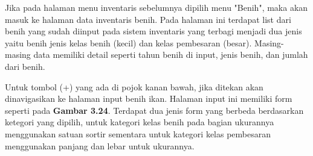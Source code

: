 \begin{enumerate}
\begin{enumerate}
		Jika pada halaman menu inventaris sebelumnya dipilih menu "Benih", maka akan masuk ke halaman data inventaris benih. Pada halaman ini terdapat list dari benih yang sudah diinput pada sistem inventaris yang terbagi menjadi dua jenis yaitu benih jenis kelas benih (kecil) dan kelas pembesaran (besar). Masing-masing data memiliki detail seperti tahun benih di input, jenis benih, dan jumlah dari benih.

		Untuk tombol (+) yang ada di pojok kanan bawah, jika ditekan akan dinavigasikan ke halaman input benih ikan. Halaman input ini memiliki form seperti pada \textbf{Gambar 3.24}. Terdapat dua jenis form yang berbeda berdasarkan ketegori yang dipilih, untuk kategori kelas benih pada bagian ukurannya menggunakan satuan sortir sementara untuk kategori kelas pembesaran menggunakan panjang dan lebar untuk ukurannya.


\end{enumerate}
\end{enumerate}
